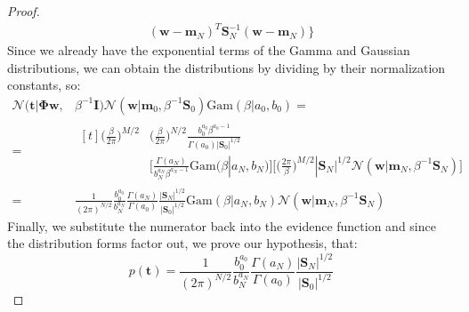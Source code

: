 \begin{proof}
\begin{align*}
            (\mathbf{w} - \mathbf{m}_N)^T\mathbf{S}_N^{-1}(\mathbf{w} - \mathbf{m}_N)\bigg\}
    \end{align*}
    Since we already have the exponential terms of the Gamma and
    Gaussian distributions, we can obtain the distributions by
    dividing by their normalization constants, so:
    \begin{align*}
        \mathcal{N}(\mathbf{t} | \mathbf{\Phi}\mathbf{w},& \beta^{-1}\mathbf{I})
        \mathcal{N}(\mathbf{w} | \mathbf{m}_0, \beta^{-1}\mathbf{S}_0)
        \text{Gam}(\beta | a_0, b_0) = \\
        =& \begin{aligned}[t] 
            \bigg(\frac{\beta}{2\pi}\bigg)^{M/2} &
            \bigg(\frac{\beta}{2\pi}\bigg)^{N/2}
            \frac{b_0^{a_0}\beta^{a_0 - 1}}{\Gamma(a_0)|\mathbf{S}_0|^{1/2}} \\
            & \bigg[\frac{\Gamma(a_N)}{b_N^{a_N}\beta^{a_N - 1}}
            \text{Gam}(\beta | a_N, b_N)\bigg]
            \bigg[\bigg(\frac{2\pi}{\beta}\bigg)^{M/2} |\mathbf{S}_N|^{1/2}
            \mathcal{N}(\mathbf{w} | \mathbf{m}_N, \beta^{-1}\mathbf{S}_N)\bigg] 
        \end{aligned} \\
        =& \frac{1}{(2\pi)^{N / 2}} \frac{b_0^{a_0}}{b_N^{a_N}}
        \frac{\Gamma(a_N)}{\Gamma(a_0)} \frac{|\mathbf{S}_N|^{1/2}}{|\mathbf{S}_0|^{1/2}}
        \text{Gam}(\beta | a_N, b_N) 
        \mathcal{N}(\mathbf{w} | \mathbf{m}_N, \beta^{-1}\mathbf{S}_N)
    \end{align*}
    Finally, we substitute the numerator back into the evidence function
    and since the distribution forms factor out, we prove our hypothesis, that:
    \begin{equation*}\tag{3.118}
        p(\mathbf{t}) = \frac{1}{(2\pi)^{N / 2}} \frac{b_0^{a_0}}{b_N^{a_N}}
        \frac{\Gamma(a_N)}{\Gamma(a_0)} \frac{|\mathbf{S}_N|^{1/2}}{|\mathbf{S}_0|^{1/2}}
    \end{equation*}
\end{proof}
